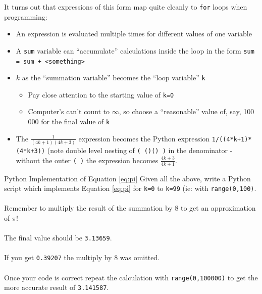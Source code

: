 \documentclass{lab}
\begin{document}
It turns out that expressions of this form map quite cleanly to \texttt{for} loops when programming:

\begin{itemize}
\item An expression is evaluated multiple times for different values of one variable
\item A \texttt{sum} variable can ``accumulate'' calculations inside the loop in the form \texttt{sum = sum + <something>}
\item $k$ as the ``summation variable'' becomes the ``loop variable'' \texttt{k}
	\begin{itemize}
		\item Pay close attention to the starting value of \texttt{k=0}
		\item Computer's can't count to $\infty$, so choose a ``reasonable'' value of, say, 100 000 for the final value of \texttt{k}
	\end{itemize}
\item The $\frac{1}{(4k+1)(4k+3)}$ expression becomes the Python expression \texttt{1/((4*k+1)*(4*k+3))} (note double level nesting of \texttt{( ()() )} in the denominator - without the outer \texttt{( )} the expression becomes $\frac{4k+3}{4k+1}$.
\end{itemize}

\begin{task}{Python Implementation of Equation \ref{eq:pi}}{}
Given all the above, write a Python script which implements Equation \ref{eq:pi} for \texttt{k=0} to \texttt{k=99} (ie: with \texttt{range(0,100)}.
\\~\\
Remember to multiply the result of the summation by 8 to get an approximation of $\pi$!
\\~\\
The final value should be \texttt{3.13659}.
\\~\\
If you get \texttt{0.39207} the multiply by 8 was omitted.
\\~\\
Once your code is correct repeat the calculation with \texttt{range(0,100000)} to get the more accurate result of \texttt{3.141587}.
\end{task}

\pagebreak
\end{document}
